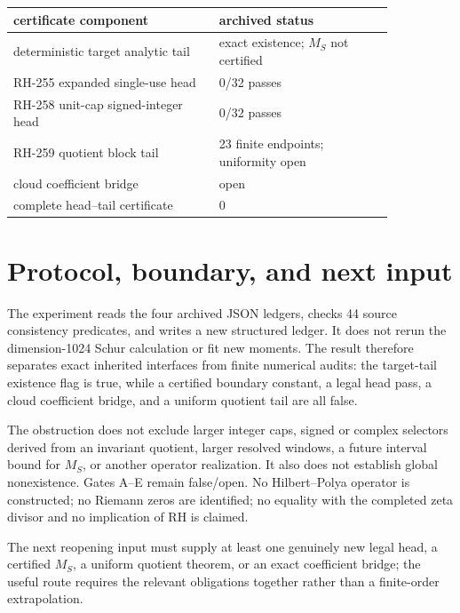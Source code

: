 \documentclass[11pt]{article}
\theoremstyle{definition}
\theoremstyle{remark}
\begin{document}
\begin{center}
\small
\begin{tabular}{p{0.46\linewidth}p{0.39\linewidth}}
\toprule
certificate component & archived status \\
\midrule
deterministic target analytic tail & exact existence; $M_S$ not certified \\
RH-255 expanded single-use head & 0/32 passes \\
RH-258 unit-cap signed-integer head & 0/32 passes \\
RH-259 quotient block tail & 23 finite endpoints; uniformity open \\
cloud coefficient bridge & open \\
complete head--tail certificate & 0 \\
\bottomrule
\end{tabular}
\end{center}

\section{Protocol, boundary, and next input}

The experiment reads the four archived JSON ledgers, checks 44 source
consistency predicates, and writes a new structured ledger.  It does not
rerun the dimension-1024 Schur calculation or fit new moments.  The result
therefore separates exact inherited interfaces from finite numerical audits:
the target-tail existence flag is true, while a certified boundary constant,
a legal head pass, a cloud coefficient bridge, and a uniform quotient tail
are all false.

The obstruction does not exclude larger integer caps, signed or complex
selectors derived from an invariant quotient, larger resolved windows, a
future interval bound for $M_S$, or another operator realization.  It also
does not establish global nonexistence.  Gates A--E remain false/open.  No
Hilbert--Polya operator is constructed; no Riemann zeros are identified; no
equality with the completed zeta divisor and no implication of RH is claimed.

The next reopening input must supply at least one genuinely new legal head,
a certified $M_S$, a uniform quotient theorem, or an exact coefficient bridge;
the useful route requires the relevant obligations together rather than a
finite-order extrapolation.



\end{document}

